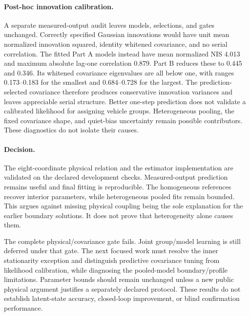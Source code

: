 \paragraph{Post-hoc innovation calibration.}
A separate measured-output audit leaves models, selections, and gates
unchanged. Correctly specified Gaussian innovations would have unit mean
normalized innovation squared, identity whitened covariance, and no serial
correlation. The fitted Part A models instead have mean normalized NIS
4.013 and maximum absolute lag-one correlation 0.879. Part B reduces these
to 0.445 and 0.346. Its whitened covariance eigenvalues are all below one,
with ranges 0.173--0.183 for the smallest and 0.684--0.728 for the largest.
The prediction-selected covariance therefore produces conservative innovation
variances and leaves appreciable serial structure. Better one-step prediction
does not validate a calibrated likelihood for assigning vehicle groups.
Heterogeneous pooling, the fixed covariance shape, and quiet-bias uncertainty
remain possible contributors. These diagnostics do not isolate their causes.

\paragraph{Decision.}
The eight-coordinate physical relation and the estimator implementation are
validated on the declared development checks. Measured-output prediction
remains useful and final fitting is reproducible. The homogeneous references
recover interior parameters, while heterogeneous pooled fits remain bounded.
This argues against missing physical coupling being the sole explanation for
the earlier boundary solutions. It does not prove that heterogeneity alone
causes them.

The complete physical/covariance gate fails. Joint group/model learning is
still deferred under that gate. The next focused work must resolve the inner
stationarity exception and distinguish predictive covariance tuning from
likelihood calibration, while diagnosing the pooled-model boundary/profile
limitations. Parameter bounds should remain unchanged unless a new public
physical argument justifies a separately declared protocol. These results
do not establish latent-state accuracy, closed-loop improvement, or blind
confirmation performance.

